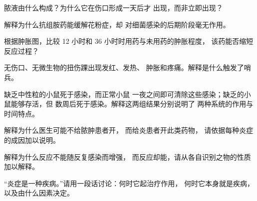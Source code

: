 \begin{exercise}[$\star\star$]\label{exo:g12:innate-immunity:8}
脓液由什么构成？为什么它在伤口形成一天后才
出现，而非立即出现？
\end{exercise}

\begin{exercise}[$\star\star$]\label{exo:g12:innate-immunity:9}
解释为什么抗组胺药能缓解花粉症，却
对细菌感染的后期阶段毫无作用。
\end{exercise}

\begin{exercise}[$\star\star$]\label{exo:g12:innate-immunity:10}
根据肿胀图，比较 12 小时和 36 小时时用药与未用药的肿胀程度，
该药能否缩短反应过程？
\end{exercise}

\begin{exercise}[$\star\star$]\label{exo:g12:innate-immunity:11}
无伤口、无微生物的扭伤踝出现发红、发热、
肿胀和疼痛。解释是什么触发了哨兵。
\end{exercise}

\begin{exercise}[$\star\star\star$]\label{exo:g12:innate-immunity:12}
缺乏中性粒的小鼠死于感染，而正常小鼠
一夜之间即可清除这些感染；缺乏的小鼠能够存活，但
数周后死于感染。解释这两组结果分别说明了
两种系统的作用与时间特点。
\end{exercise}

\begin{exercise}[$\star\star\star$]\label{exo:g12:innate-immunity:13}
解释为什么医生可能不给脓肿患者开，
而给炎患者开此类药物，
请依据每种炎症的成因加以说明。
\end{exercise}

\begin{exercise}[$\star\star\star$]\label{exo:g12:innate-immunity:14}
解释为什么反应不能随反复感染而增强，
而反应却能，请从各自识别之物的性质
加以解释。
\end{exercise}

\begin{exercise}[$\star\star\star$]\label{exo:g12:innate-immunity:15}
“炎症是一种疾病。”请用一段话讨论：何时它起治疗作用，
何时它本身就是疾病，以及由什么因素决定。
\end{exercise}

